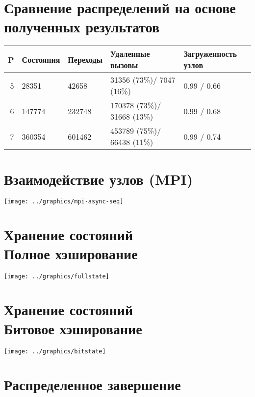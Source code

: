 \documentclass[12pt]{article}
\begin{document}
\section{Сравнение распределений на основе полученных результатов}
\label{sec:partition-compare}

\begin{tabular}[ht]{|r|l|l|p{}|p{}|}
  \hline 
  P & Состояния & Переходы & Удаленные вызовы & Загруженность узлов    \\ \hline
  5 & 28351     & 42658    & 31356  (73\%)/ 7047  (16\%) & 0.99 / 0.66 \\ \hline
  6 & 147774    & 232748   & 170378 (73\%)/ 31668 (13\%) & 0.99 / 0.68 \\ \hline
  7 & 360354    & 601462   & 453789 (75\%)/ 66438 (11\%) & 0.99 / 0.74 \\ \hline
\end{tabular}

\section{Взаимодействие узлов (MPI)}
\label{sec:mpi-interaction}

\begin{center}
  \texttt{[image: ../graphics/mpi-async-seq]}
\end{center}

\section{Хранение состояний \\ \small{Полное хэширование}}
\label{sec:fullstate}

\begin{center}
  \texttt{[image: ../graphics/fullstate]}
\end{center}

\section{Хранение состояний \\ \small{Битовое хэширование}}
\label{sec:buthash}

\begin{center}
  \texttt{[image: ../graphics/bitstate]}
\end{center}

\section{Распределенное завершение}
\label{sec:distributed-termination}
\end{document}
